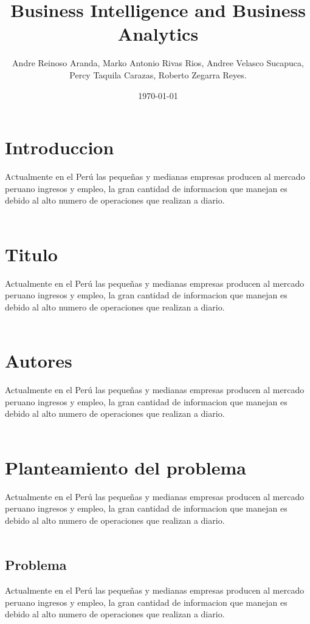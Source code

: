 \documentclass[twoside,twocolumn]{article}
\title{Business Intelligence and Business Analytics}
\author{Andre Reinoso Aranda, Marko Antonio Rivas Rios, Andree Velasco Sucapuca, \\
Percy Taquila Carazas, Roberto Zegarra Reyes. }
\date{\today}
\begin{document}
\maketitle


\section{Introduccion}
\lettrine[nindent=0em,lines=3]{A}ctualmente en el Perú las pequeñas y medianas empresas producen al mercado peruano ingresos y empleo, la gran cantidad de informacion que manejan es debido al alto numero de operaciones que realizan a diario.\\ \\

\section{Titulo}
Actualmente en el Perú las pequeñas y medianas empresas producen al mercado peruano ingresos y empleo, la gran cantidad de informacion que manejan es debido al alto numero de operaciones que realizan a diario.\\ \\

\section{Autores}
Actualmente en el Perú las pequeñas y medianas empresas producen al mercado peruano ingresos y empleo, la gran cantidad de informacion que manejan es debido al alto numero de operaciones que realizan a diario.\\ \\

\section{Planteamiento del problema}
Actualmente en el Perú las pequeñas y medianas empresas producen al mercado peruano ingresos y empleo, la gran cantidad de informacion que manejan es debido al alto numero de operaciones que realizan a diario.\\ \\

\subsection{Problema}
Actualmente en el Perú las pequeñas y medianas empresas producen al mercado peruano ingresos y empleo, la gran cantidad de informacion que manejan es debido al alto numero de operaciones que realizan a diario.\\ \\
\end{document}
